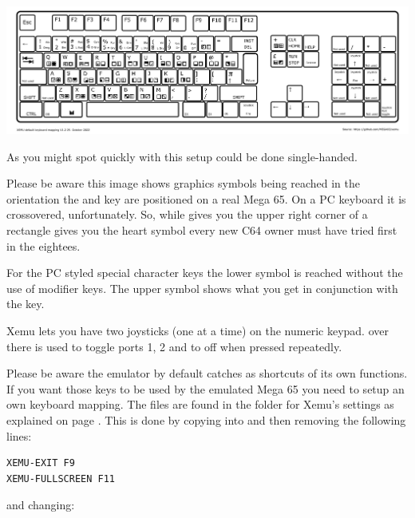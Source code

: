 \begin{center}
  \includegraphics[width=\linewidth]{images/xemu-extended-keyboard.png}
\end{center}

As you might spot quickly with this setup   could
be done single-handed.

Please be aware this image shows graphics symbols being reached in the orientation the
\megasymbolkey and  key are positioned on a real Mega 65. On a PC
keyboard it is crossovered, unfortunately. So, while \megasymbolkey {} gives
you the upper right corner of a rectangle   gives you the
heart symbol every new C64 owner must have tried first in the eightees.

For the PC styled special character keys the lower symbol is reached without the use
of modifier keys. The upper symbol shows what you get in conjunction with the
 key.

Xemu lets you have two joysticks (one at a time) on the numeric keypad.
 over there is used to toggle ports 1, 2 and to off when pressed
repeatedly.

Please be aware the emulator by default catches  
 as shortcuts of its own functions. If you want those keys to be used by
the emulated Mega 65 you need to setup an own keyboard mapping. The files are found
in the folder for Xemu's settings as explained on page
\pageref{sec:sdcard-settings-location}. This is done by copying
 into  and then removing the following lines:

\begin{tcolorbox}[colback=black,coltext=white]
\verbatimfont{\codefont}
\begin{verbatim}
XEMU-EXIT F9
XEMU-FULLSCREEN F11
\end{verbatim}
\end{tcolorbox}

and changing:

